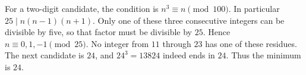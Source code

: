 For a two-digit candidate, the condition is $n^3\equiv n\pmod{100}$. In particular $25\mid n(n-1)(n+1)$. Only one of these three consecutive integers can be divisible by five, so that factor must be divisible by $25$. Hence $n\equiv0,1,-1\pmod{25}$. No integer from $11$ through $23$ has one of these residues. The next candidate is $24$, and $24^3=13824$ indeed ends in $24$. Thus the minimum is $\boxed{24}$.
